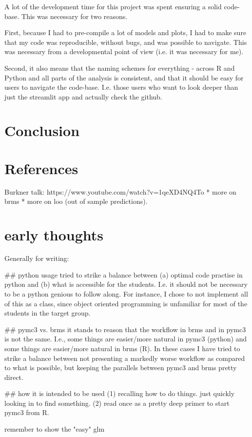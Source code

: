 \documentclass[12pt]{article}
\begin{document}
A lot of the development time for this project was spent ensuring a
solid code-base. This was necessary for two reasons.

First, because I had to pre-compile a lot of models and plots,
I had to make sure that my code was reproducible, without bugs,
and was possible to navigate. This was necessary from a developmental
point of view (i.e. it was necessary for me).

Second, it also means that the naming schemes for everything -
across R and Python and all parts of the analysis is consistent,
and that it should be easy for users to navigate the code-base.
I.e. those users who want to look deeper than just the streamlit app
and actually check the github.

\section{Conclusion}

\section{References}

Burkner talk: https://www.youtube.com/watch?v=1qeXD4NQ4To
* more on brms
* more on loo (out of sample predictions).

\section{early thoughts}
Generally for writing:

## python usage
tried to strike a balance between (a) optimal code practise
in python and (b) what is accessible for the students.
I.e. it should not be necessary to be a python genious to follow along.
For instance, I chose to not implement all of this as a class,
since object oriented programming is unfamiliar for most of
the students in the target group.

## pymc3 vs. brms
it stands to reason that the workflow in brms and in pymc3
is not the same. I.e., some things are easier/more natural in pymc3 (python) and
some things are easier/more natural in brms (R).
In these cases I have tried to strike a balance between not presenting
a markedly worse workflow as compared to what is possible, but keeping
the parallels between pymc3 and brms pretty direct.

## how it is intended to be used
(1) recalling how to do things. just quickly looking in to find something.
(2) read once as a pretty deep primer to start pymc3 from R.

remember to show the "easy" glm

\printbibliography
\end{document}
